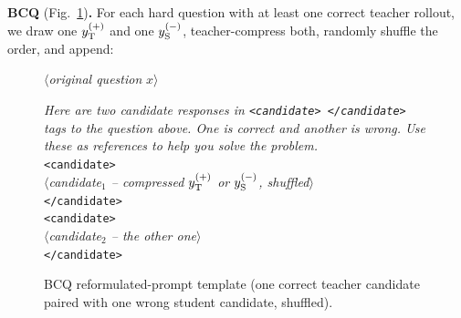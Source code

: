 \noindent\textbf{BCQ} (Fig.~\ref{fig:prompt-bcq})\textbf{.} For each hard question with at least one correct teacher rollout, we draw one $y_{\rm T}^{(+)}$ and one $y_{\rm S}^{(-)}$, teacher-compress both, randomly shuffle the order, and append:
\begin{figure}[!htbp]
\begin{prompttemplatefig}
\small
$\langle$\emph{original question} $x$$\rangle$

\emph{Here are two candidate responses in \texttt{<candidate> </candidate>} tags to the question above. One is correct and another is wrong. Use these as references to help you solve the problem.}\\
\texttt{<candidate>}\\
$\langle$\emph{candidate$_1$ -- compressed $y_{\rm T}^{(+)}$ or $y_{\rm S}^{(-)}$, shuffled}$\rangle$\\
\texttt{</candidate>}\\
\texttt{<candidate>}\\
$\langle$\emph{candidate$_2$ -- the other one}$\rangle$\\
\texttt{</candidate>}
\end{prompttemplatefig}
\caption{BCQ reformulated-prompt template (one correct teacher candidate paired with one wrong student candidate, shuffled).}
\label{fig:prompt-bcq}
\end{figure}

